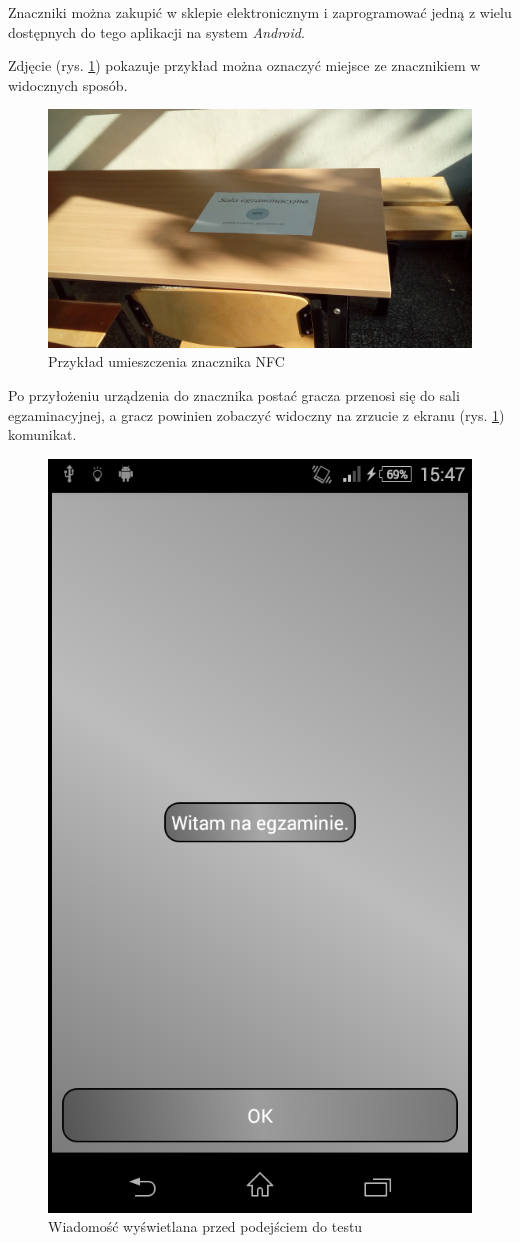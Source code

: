 \documentclass[openright]{xmgr}
\begin{document}
Znaczniki można zakupić w sklepie elektronicznym i zaprogramować jedną z wielu dostępnych do tego aplikacji na system \textit{Android}.

Zdjęcie (rys. \ref{game:tag:example}) pokazuje przykład można oznaczyć miejsce ze znacznikiem w widocznych sposób.
\begin{figure}[!tbh]
	\centering
	\includegraphics[width=0.8\hsize]{fig/tag_example}
	\caption{Przykład umieszczenia znacznika NFC}
	\label{game:tag:example}
\end{figure}

Po przyłożeniu urządzenia do znacznika postać gracza przenosi się do sali egzaminacyjnej, a gracz powinien zobaczyć widoczny na zrzucie z ekranu (rys. \ref{game:tag:example}) komunikat.

\begin{figure}[!tbh]
	\centering
	\includegraphics[width=0.4\hsize]{fig/exam_message}
	\caption{Wiadomość wyświetlana przed podejściem do testu}
	\label{screen:exam:message}
\end{figure}
\end{document}

